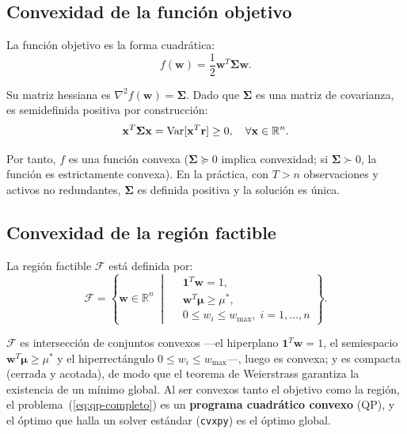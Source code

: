 \subsection{Convexidad de la función objetivo}

La función objetivo es la forma cuadrática:
\begin{equation}
    f(\mathbf{w}) = \frac{1}{2} \mathbf{w}^T \boldsymbol{\Sigma} \mathbf{w}.
    \label{eq:funcion-objetivo}
\end{equation}

Su matriz hessiana es $\nabla^2 f(\mathbf{w}) = \boldsymbol{\Sigma}$. Dado
que $\boldsymbol{\Sigma}$ es una matriz de covarianza, es semidefinida
positiva por construcción:
\begin{equation}
    \mathbf{x}^T \boldsymbol{\Sigma} \mathbf{x}
    = \mathop{\textnormal{Var}}\nolimits[\mathbf{x}^T \mathbf{r}] \ge 0,
    \quad \forall \mathbf{x} \in \mathbb{R}^n.
    \label{eq:psd}
\end{equation}

Por tanto, $f$ es una función convexa ($\boldsymbol{\Sigma} \succeq 0$
implica convexidad; si $\boldsymbol{\Sigma} \succ 0$, la función es
estrictamente convexa). En la práctica, con $T > n$ observaciones y
activos no redundantes, $\boldsymbol{\Sigma}$ es definida positiva y la
solución es única.

\subsection{Convexidad de la región factible}

La región factible $\mathcal{F}$ está definida por:
\begin{equation}
    \mathcal{F} = \left\{
        \mathbf{w} \in \mathbb{R}^n \;\middle|\;
        \begin{aligned}
            &\mathbf{1}^T \mathbf{w} = 1, \\
            &\mathbf{w}^T \boldsymbol{\mu} \ge \mu^*, \\
            &0 \le w_i \le w_{\max}, \; i = 1, \dots, n
        \end{aligned}
    \right\}.
    \label{eq:region-factible}
\end{equation}

$\mathcal{F}$ es intersección de conjuntos convexos ---el hiperplano
$\mathbf{1}^T \mathbf{w} = 1$, el semiespacio $\mathbf{w}^T \boldsymbol{\mu} \ge
\mu^*$ y el hiperrectángulo $0 \le w_i \le w_{\max}$---, luego es convexa; y es
compacta (cerrada y acotada), de modo que el teorema de Weierstrass garantiza la
existencia de un mínimo global. Al ser convexos tanto el objetivo como la
región, el problema~(\ref{eq:qp-completo}) es un \textbf{programa cuadrático
convexo} (QP), y el óptimo que halla un solver estándar (\texttt{cvxpy}) es el
óptimo global.

